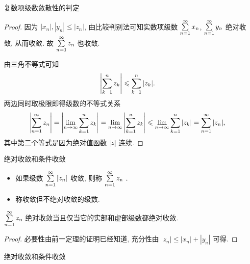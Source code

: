 \begin{frame}{复数项级数敛散性的判定}
\beqskip{7pt}
\begin{proof}
\indent
因为 $|x_n|,|y_n|\le|z_n|$, 由比较判别法可知实数项级数 $\sum\limits_{n=1}^\infty x_n$, $\sum\limits_{n=1}^\infty y_n$ 绝对收敛, 从而收敛.
\onslide<+->
故 $\sum\limits_{n=1}^\infty z_n$ 也收敛.

\onslide<+->
\indent
由三角不等式可知
\[\left|\sum_{k=1}^n z_k\right|\leqslant \sum_{k=1}^n|z_k|.\]
\onslide<+->
两边同时取极限即得级数的不等式关系
\[\left|\sum_{n=1}^\infty z_n\right|=\left|\lim_{n\to\infty}\sum_{k=1}^n z_k\right|=
\lim_{n\to\infty}\left|\sum_{k=1}^n z_k\right|\leqslant\lim_{n\to\infty}\sum_{k=1}^n|z_k|=\sum_{n=1}^\infty |z_n|,\]
\onslide<+->
其中第二个等式是因为绝对值函数 $|z|$ 连续.
\end{proof}
\endgroup
\end{frame}


\begin{frame}{绝对收敛和条件收敛}
\begin{definition}
\begin{itemize}
\item 如果级数 $\sum\limits_{n=1}^\infty |z_n|$ 收敛, 则称 $\sum\limits_{n=1}^\infty z_n$ .
\item 称收敛但不绝对收敛的级数.
\end{itemize}
\end{definition}
\begin{theorem}
$\sum\limits_{n=1}^\infty z_n$ 绝对收敛当且仅当它的实部和虚部级数都绝对收敛.
\end{theorem}
\begin{proof}
必要性由前一定理的证明已经知道,
\onslide<+->
充分性由 $|z_n|\le|x_n|+|y_n|$ 可得.
\end{proof}
\end{frame}


\begin{frame}{绝对收敛和条件收敛}
\begin{center}
\renewcommand\arraystretch{2}
{}
\end{center}
\end{frame}


